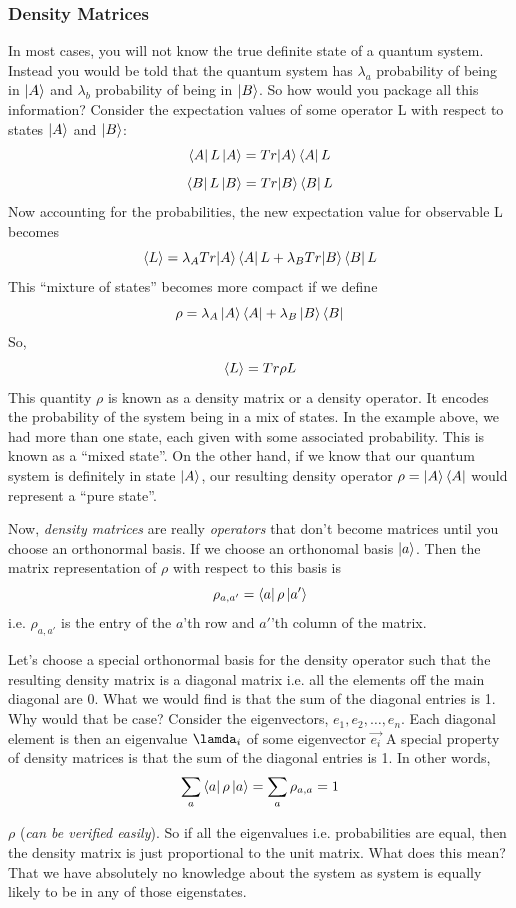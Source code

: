 \documentclass{article}
\begin{document}
\subsubsection{Density Matrices}
In most cases, you will not know the true definite state of a quantum system. Instead
you would be told that the quantum system has \(\lambda_a\) probability of
being in \(\ket{A}\) and \(\lambda_b\) probability of being in \(\ket{B}\).
So how would you package all this information?
Consider the expectation values of some operator L with respect to states
\(\ket{A}\) and \(\ket{B}\):
\[\bra{A}L\ket{A} = Tr{\ket{A}\bra{A}L}\]
\[\bra{B}L\ket{B} = Tr{\ket{B}\bra{B}L}\]
Now accounting for the probabilities, the new expectation value for observable
L becomes
\[\expval{L} =\lambda_A Tr{\ket{A}\bra{A}L} +\lambda_B Tr{\ket{B}\bra{B}L} \]
This ``mixture of states'' becomes more compact if we define
\[\rho = \lambda_A \ket{A}\bra{A} + \lambda_B \ket{B}\bra{B} \]
So,
\[\expval{L} =Tr{\rho L}\]
This quantity \(\rho\) is known as a density matrix or a density operator.
It encodes the probability of the system being in a mix of states. In the
example above, we had more than one state, each given with some associated
probability. This is known as a ``mixed state''. On the other hand, if we
know that our quantum system is definitely in state \(\ket{A}\), our resulting
density operator \(\rho = \ket{A}\bra{A}\) would represent a ``pure state''.

Now, \textit{density matrices} are really \textit{operators} that don't become
matrices until you choose an orthonormal basis. If we choose an orthonomal
basis \(\ket{a}\). Then the matrix representation of \(\rho\) with respect
to this basis is
\[\rho_{a, a'} = \bra{a}\rho\ket{a'}\]
i.e. \(\rho_{a, a'} \) is the entry of the \(a\)'th row and \(a'\)'th
column of the matrix.

Let's choose a special orthonormal basis for the density operator such that
the resulting density matrix is a diagonal matrix i.e. all the elements off the
main diagonal are 0. What we would find is that the sum of the diagonal entries
is 1. Why would that be case? Consider the eigenvectors, \(e_1,
e_2, \ldots, e_n\). Each diagonal element is then an eigenvalue \(\lamda_i\)
of some eigenvector \(\vec{e_i}\)
A special property of density matrices is that the sum of the diagonal entries is 1.
In other words,
\[ \sum_a \bra{a}\rho\ket{a} =\sum_a \rho_{a,a} = 1\]

\(\rho\) (\textit{can be verified easily}).  So if all
the eigenvalues i.e. probabilities are equal, then the density matrix is just proportional to
the unit matrix. What does this mean? That we have absolutely no knowledge
about the system as system is equally likely to be in any of those eigenstates.
\end{document}
